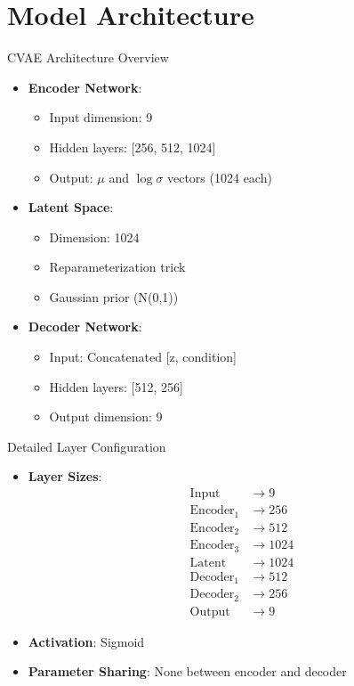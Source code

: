 \documentclass{beamer}
\begin{document}
\section{Model Architecture}

\begin{frame}{CVAE Architecture Overview}
    \begin{itemize}
        \item \textbf{Encoder Network}:
        \begin{itemize}
            \item Input dimension: 9
            \item Hidden layers: [256, 512, 1024]
            \item Output: $\mu$ and $\log\sigma$ vectors (1024 each)
        \end{itemize}
        \item \textbf{Latent Space}:
        \begin{itemize}
            \item Dimension: 1024
            \item Reparameterization trick
            \item Gaussian prior (N(0,1))
        \end{itemize}
        \item \textbf{Decoder Network}:
        \begin{itemize}
            \item Input: Concatenated [z, condition]
            \item Hidden layers: [512, 256]
            \item Output dimension: 9
        \end{itemize}
    \end{itemize}
\end{frame}

\begin{frame}{Detailed Layer Configuration}
    \begin{itemize}
        \item \textbf{Layer Sizes}:
        \begin{align*}
            \text{Input} &\rightarrow 9 \\
            \text{Encoder}_1 &\rightarrow 256 \\
            \text{Encoder}_2 &\rightarrow 512 \\
            \text{Encoder}_3 &\rightarrow 1024 \\
            \text{Latent} &\rightarrow 1024 \\
            \text{Decoder}_1 &\rightarrow 512 \\
            \text{Decoder}_2 &\rightarrow 256 \\
            \text{Output} &\rightarrow 9
        \end{align*}
        \item \textbf{Activation}: Sigmoid
        \item \textbf{Parameter Sharing}: None between encoder and decoder
    \end{itemize}
\end{frame}
\end{document}
